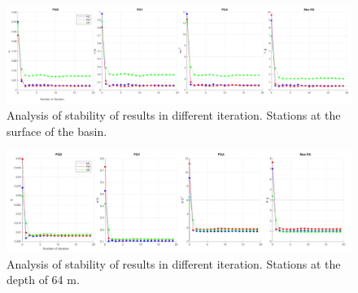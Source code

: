 \begin{figure}
    \centering
    \includegraphics[width=\textwidth]{figures/pdf/iteration_surface.pdf}
    \caption{Analysis of stability of results in different iteration. Stations at the surface of the basin.}
    \label{fig:iteration_surface}
\end{figure}


\begin{figure}
    \centering
    \includegraphics[width=\textwidth]{figures/pdf/iteration_deep_64.pdf}
    \caption{Analysis of stability of results in different iteration. Stations at the depth of 64 m.}
    \label{fig:iteration_deep_64}
\end{figure}


